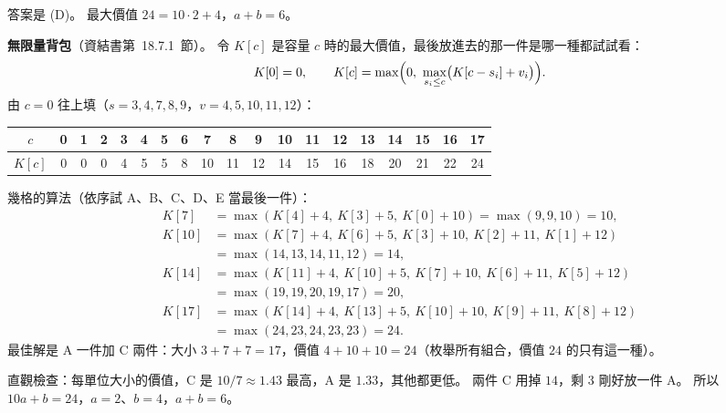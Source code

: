 \begin{pastsoln}
答案是 (D)。 最大價值 $24 = 10 \cdot 2 + 4$，$a + b = 6$。

\textbf{無限量背包}（資結書第~18.7.1~節）。 令 $K[c]$ 是容量 $c$ 時的最大價值，最後放進去的那一件是哪一種都試試看：
\[
K[0] = 0, \qquad K[c] = \max\Bigl(0,\ \max_{s_i \le c} \bigl(K[c - s_i] + v_i\bigr)\Bigr).
\]
由 $c = 0$ 往上填（$s = 3, 4, 7, 8, 9$，$v = 4, 5, 10, 11, 12$）：
\begin{center}
\begin{tabular}{c|cccccccccccccccccc}
$c$ & 0 & 1 & 2 & 3 & 4 & 5 & 6 & 7 & 8 & 9 & 10 & 11 & 12 & 13 & 14 & 15 & 16 & 17 \\ \hline
$K[c]$ & 0 & 0 & 0 & 4 & 5 & 5 & 8 & 10 & 11 & 12 & 14 & 15 & 16 & 18 & 20 & 21 & 22 & 24
\end{tabular}
\end{center}
幾格的算法（依序試 A、B、C、D、E 當最後一件）：
\begin{align*}
K[7] &= \max(K[4] + 4,\ K[3] + 5,\ K[0] + 10) = \max(9, 9, 10) = 10,\\
K[10] &= \max(K[7] + 4,\ K[6] + 5,\ K[3] + 10,\ K[2] + 11,\ K[1] + 12)\\
 &= \max(14, 13, 14, 11, 12) = 14,\\
K[14] &= \max(K[11] + 4,\ K[10] + 5,\ K[7] + 10,\ K[6] + 11,\ K[5] + 12)\\
 &= \max(19, 19, 20, 19, 17) = 20,\\
K[17] &= \max(K[14] + 4,\ K[13] + 5,\ K[10] + 10,\ K[9] + 11,\ K[8] + 12)\\
 &= \max(24, 23, 24, 23, 23) = 24.
\end{align*}
最佳解是 A 一件加 C 兩件：大小 $3 + 7 + 7 = 17$，價值 $4 + 10 + 10 = 24$（枚舉所有組合，價值 $24$ 的只有這一種）。

直觀檢查：每單位大小的價值，C 是 $10/7 \approx 1.43$ 最高，A 是 $1.33$，其他都更低。 兩件 C 用掉 $14$，剩 $3$ 剛好放一件 A。
所以 $10a + b = 24$，$a = 2$、$b = 4$，$a + b = 6$。
\end{pastsoln}
